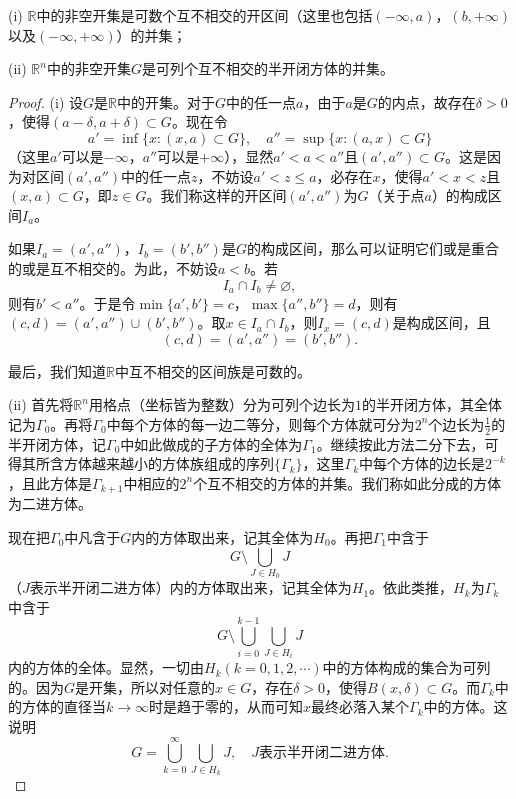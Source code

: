 \documentclass[../../main.tex]{subfiles}
\begin{document}
\begin{theorem}[开集构造定理]\label{theorem:开集构造定理}
(i) \(\mathbb{R}\)中的非空开集是可数个互不相交的开区间（这里也包括\((-\infty,a)\)，\((b,+\infty)\)以及\((-\infty,+\infty)\)）的并集；

(ii) \(\mathbb{R}^n\)中的非空开集\(G\)是可列个互不相交的半开闭方体的并集。
\end{theorem}
\begin{proof}
  (i) 设\(G\)是\(\mathbb{R}\)中的开集。对于\(G\)中的任一点\(a\)，由于\(a\)是\(G\)的内点，故存在\(\delta>0\)，使得\((a - \delta,a + \delta)\subset G\)。现在令
\[a'=\inf\{x:(x,a)\subset G\},\quad a''=\sup\{x:(a,x)\subset G\}\]
（这里\(a'\)可以是\(-\infty\)，\(a''\)可以是\(+\infty\)），显然\(a'<a<a''\)且\((a',a'')\subset G\)。这是因为对区间\((a',a'')\)中的任一点\(z\)，不妨设\(a'<z\leqslant a\)，必存在\(x\)，使得\(a'<x<z\)且\((x,a)\subset G\)，即\(z\in G\)。我们称这样的开区间\((a',a'')\)为\(G\)（关于点\(a\)）的{\heiti 构成区间}\(I_a\)。

如果\(I_a=(a',a'')\)，\(I_b=(b',b'')\)是\(G\)的构成区间，那么可以证明它们或是重合的或是互不相交的。为此，不妨设\(a < b\)。若
\[I_a\cap I_b\neq\varnothing,\]
则有\(b'<a''\)。于是令\(\min\{a',b'\}=c\)，\(\max\{a'',b''\}=d\)，则有\((c,d)=(a',a'')\cup(b',b'')\)。取\(x\in I_a\cap I_b\)，则\(I_x=(c,d)\)是构成区间，且
\[(c,d)=(a',a'')=(b',b'').\]

最后，我们知道\(\mathbb{R}\)中互不相交的区间族是可数的。

(ii) 首先将\(\mathbb{R}^n\)用格点（坐标皆为整数）分为可列个边长为\(1\)的半开闭方体，其全体记为\(\Gamma_0\)。再将\(\Gamma_0\)中每个方体的每一边二等分，则每个方体就可分为\(2^n\)个边长为\(\frac{1}{2}\)的半开闭方体，记\(\Gamma_0\)中如此做成的子方体的全体为\(\Gamma_1\)。继续按此方法二分下去，可得其所含方体越来越小的方体族组成的序列\(\{\Gamma_k\}\)，这里\(\Gamma_k\)中每个方体的边长是\(2^{-k}\)，且此方体是\(\Gamma_{k + 1}\)中相应的\(2^n\)个互不相交的方体的并集。我们称如此分成的方体为二进方体。

现在把\(\Gamma_0\)中凡含于\(G\)内的方体取出来，记其全体为\(H_0\)。再把\(\Gamma_1\)中含于
\[G\setminus\bigcup_{J\in H_0}J\]
（\(J\)表示半开闭二进方体）内的方体取出来，记其全体为\(H_1\)。依此类推，\(H_k\)为\(\Gamma_k\)中含于
\[G\setminus\bigcup_{i = 0}^{k - 1}\bigcup_{J\in H_i}J\]
内的方体的全体。显然，一切由\(H_k(k = 0,1,2,\cdots)\)中的方体构成的集合为可列的。因为\(G\)是开集，所以对任意的\(x\in G\)，存在\(\delta>0\)，使得\(B(x,\delta)\subset G\)。而\(\Gamma_k\)中的方体的直径当\(k\rightarrow\infty\)时是趋于零的，从而可知\(x\)最终必落入某个\(\Gamma_k\)中的方体。这说明
\[G=\bigcup_{k = 0}^{\infty}\bigcup_{J\in H_k}J,\quad J表示半开闭二进方体.\]


\end{proof}
\end{document}
